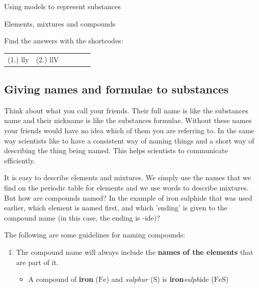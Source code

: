 \begin{activity}{Using models to represent substances}
\begin{exercises}{Elements, mixtures and compounds}
{\begin{enumerate}[noitemsep, label=\textbf{\arabic*}. ]
                \end{enumerate}
    \label{m38708*cid4}
\par {} Find the answers with the shortcodes:
 \par \begin{tabular}[h]{cccccc}
 (1.) lly  &  (2.) llV  & \end{tabular}}
\end{exercises}
            \subsection{ Giving names and formulae to substances}
            \nopagebreak
      \label{m38708*eip-379}Think about what you call your friends. Their full name is like the substances name and their nickname is like the substances formulae. Without these names your friends would have no idea which of them you are referring to. In the same way scientists like to have a consistent way of naming things and a short way of describing the thing being named. This helps scientists to communicate efficiently.     \par \label{m38708*id64028}It is easy to describe elements and mixtures. We simply use the names that we find on the periodic table for elements and we use words to describe mixtures. But how are compounds named? In the example of iron sulphide that was used earlier, which element is named first, and which 'ending' is given to the compound name (in this case, the ending is -ide)? \par 
      \label{m38708*id64033}The following are some guidelines for naming compounds:\par 
      \label{m38708*id64037}\begin{enumerate}[noitemsep, label=\textbf{\arabic*}. ] 
            \label{m38708*uid35}\item The compound name will always include the \textbf{names of the elements} that are part of it.
\label{m38708*id64059}\begin{itemize}[noitemsep]
            \label{m38708*uid36}\item A compound of \textbf{iron} ($\mathrm{Fe}$) and \textsl{sulphur} ($\mathrm{S}$) is \textbf{iron}\hspace{1ex}\textsl{sulph}ide ($\mathrm{FeS}$)

\end{itemize}
\end{enumerate}
\end{activity}
